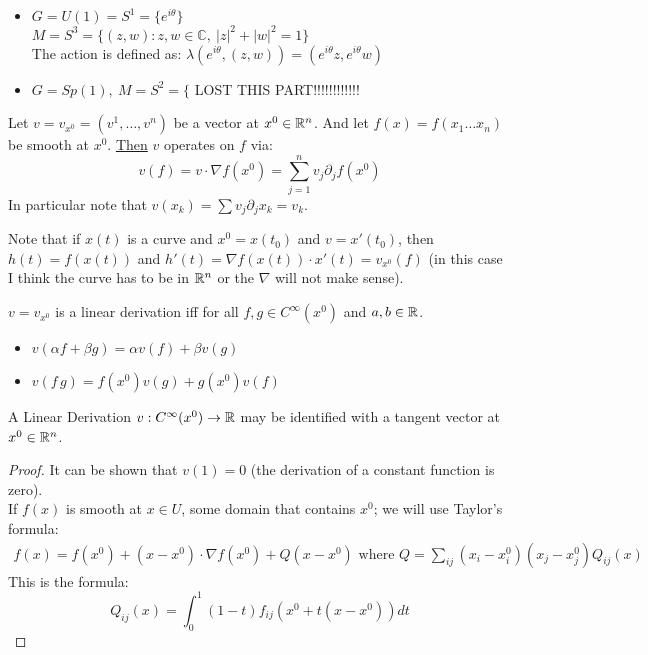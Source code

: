 \begin{examples}
\begin{itemize}
\item $G=U(1)=S^1=\{e^{i\theta}\}$\\
$M=S^3=\{(z,w): z,w\in \mathbb{C}, \ |z|^2+|w|^2=1 \}$\\
The action is defined as: $\lambda(e^{i\theta},(z,w)) = (e^{i\theta}z, e^{i\theta}w)$
\item $G=Sp(1),\ M=S^2=\{$ LOST THIS PART!!!!!!!!!!!!
\end{itemize}
\end{examples}

\begin{ddef}
Let $v=v_{x^0}=(v^1,\ldots , v^n)$ be a vector at $x^0\in \mathbb{R}^n$. And let $f(x)=f(x_1\ldots x_n)$ be smooth at $x^0$. \underline{Then} $v$ operates on $f$ via: $$v(f)=v\cdot \nabla f(x^0) = \sum_{j=1}^n v_j \partial_j f(x^0)$$
In particular note that $v(x_k)= \sum v_j\partial_j x_k = v_k$. 
\end{ddef} 

\begin{remarks}
    Note that if $x(t)$ is a curve and $x^0=x(t_0)$ and $v=x'(t_0)$, then  $h(t)=f(x(t))$ and $h'(t)=\nabla f(x(t)) \cdot x'(t)= v_{x^0}(f)$ (in this case I think the curve has to be in $\mathbb{R}^n$ or the $\nabla $ will not make sense).
\end{remarks}

\begin{ddef}
$v=v_{x^0}$ is a linear derivation iff for all $f,g\in C^\infty (x^0)$ and $a,b\in\mathbb{R}$.
\begin{itemize}
\item $v(\alpha f + \beta g) = \alpha v(f) + \beta v(g)$
\item $v(f\, g) = f(x^0)v(g) + g(x^0)v(f)$
\end{itemize}
\end{ddef}

\begin{teorema}
A Linear Derivation $v: C^\infty(x^0) \to \mathbb{R}$ may be identified with a tangent vector at $x^0 \in \mathbb{R}^n$.
\begin{proof}
It can be shown that $v(1)=0$ (the derivation of a constant function is zero).\\
If $f(x)$ is smooth at $x\in U$, some domain that contains $x^0$; we will use Taylor's formula: 
    \begin{gather*}
   f(x) = f(x^0) + (x-x^0)\cdot \nabla f(x^0) + Q(x-x^0) \text{ where } Q=\sum_{ij} (x_i - x_i^0)(x_j-x_j^0)Q_{ij}(x)
    \end{gather*}
    This is the formula:
    $$Q_{ij}(x)=\int_0^1 (1-t)f_{ij}(x^0 + t(x-x^0))dt$$
\end{proof}
\end{teorema}
